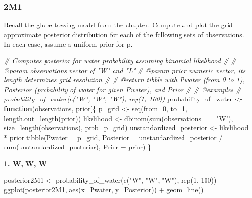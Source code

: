 \documentclass[
]{book}
\newenvironment{Shaded}{\begin{snugshade}}{\end{snugshade}}
\newcommand{\AttributeTok}[1]{\textcolor[rgb]{0.77,0.63,0.00}{#1}}
\newcommand{\CommentTok}[1]{\textcolor[rgb]{0.56,0.35,0.01}{\textit{#1}}}
\newcommand{\ControlFlowTok}[1]{\textcolor[rgb]{0.13,0.29,0.53}{\textbf{#1}}}
\newcommand{\DecValTok}[1]{\textcolor[rgb]{0.00,0.00,0.81}{#1}}
\newcommand{\FunctionTok}[1]{\textcolor[rgb]{0.00,0.00,0.00}{#1}}
\newcommand{\NormalTok}[1]{#1}
\newcommand{\OtherTok}[1]{\textcolor[rgb]{0.56,0.35,0.01}{#1}}
\newcommand{\SpecialCharTok}[1]{\textcolor[rgb]{0.00,0.00,0.00}{#1}}
\newcommand{\StringTok}[1]{\textcolor[rgb]{0.31,0.60,0.02}{#1}}
\begin{document}
\hypertarget{m1}{%
\subsubsection*{2M1}\label{m1}}

Recall the globe tossing model from the chapter. Compute and plot the grid approximate posterior distribution for each of the following sets of observations. In each case, assume a uniform prior for p.

\begin{Shaded}
\begin{Highlighting}[]
\CommentTok{\#\textquotesingle{} Computes posterior for water probability assuming binomial likelihood}
\CommentTok{\#\textquotesingle{}}
\CommentTok{\#\textquotesingle{} @param observations vector of "W" and "L"}
\CommentTok{\#\textquotesingle{} @param prior numeric vector, its length determines grid resolution}
\CommentTok{\#\textquotesingle{}}
\CommentTok{\#\textquotesingle{} @return tibble with Pwater (from 0 to 1), Posterior (probability of water for given Pwater), and Prior}
\CommentTok{\#\textquotesingle{}}
\CommentTok{\#\textquotesingle{} @examples}
\CommentTok{\#\textquotesingle{} probability\_of\_water(c("W", "W", "W"), rep(1, 100))}
\NormalTok{probability\_of\_water }\OtherTok{\textless{}{-}} \ControlFlowTok{function}\NormalTok{(observations, prior)\{}
\NormalTok{  p\_grid }\OtherTok{\textless{}{-}} \FunctionTok{seq}\NormalTok{(}\AttributeTok{from=}\DecValTok{0}\NormalTok{, }\AttributeTok{to=}\DecValTok{1}\NormalTok{, }\AttributeTok{length.out=}\FunctionTok{length}\NormalTok{(prior))}
\NormalTok{  likelihood }\OtherTok{\textless{}{-}} \FunctionTok{dbinom}\NormalTok{(}\FunctionTok{sum}\NormalTok{(observations }\SpecialCharTok{==} \StringTok{"W"}\NormalTok{), }\AttributeTok{size=}\FunctionTok{length}\NormalTok{(observations), }\AttributeTok{prob=}\NormalTok{p\_grid)}
\NormalTok{  unstandardized\_posterior }\OtherTok{\textless{}{-}}\NormalTok{ likelihood }\SpecialCharTok{*}\NormalTok{ prior}
  \FunctionTok{tibble}\NormalTok{(}\AttributeTok{Pwater =}\NormalTok{ p\_grid,}
         \AttributeTok{Posterior =}\NormalTok{ unstandardized\_posterior }\SpecialCharTok{/} \FunctionTok{sum}\NormalTok{(unstandardized\_posterior),}
         \AttributeTok{Prior =}\NormalTok{ prior)}
\NormalTok{\}}
\end{Highlighting}
\end{Shaded}

\textbf{1. W, W, W}

\begin{Shaded}
\begin{Highlighting}[]
\NormalTok{posterior2M1 }\OtherTok{\textless{}{-}} \FunctionTok{probability\_of\_water}\NormalTok{(}\FunctionTok{c}\NormalTok{(}\StringTok{"W"}\NormalTok{, }\StringTok{"W"}\NormalTok{, }\StringTok{"W"}\NormalTok{), }\FunctionTok{rep}\NormalTok{(}\DecValTok{1}\NormalTok{, }\DecValTok{100}\NormalTok{))}
\FunctionTok{ggplot}\NormalTok{(posterior2M1, }\FunctionTok{aes}\NormalTok{(}\AttributeTok{x=}\NormalTok{Pwater, }\AttributeTok{y=}\NormalTok{Posterior)) }\SpecialCharTok{+} 
  \FunctionTok{geom\_line}\NormalTok{()}
\end{Highlighting}
\end{Shaded}
\end{document}
